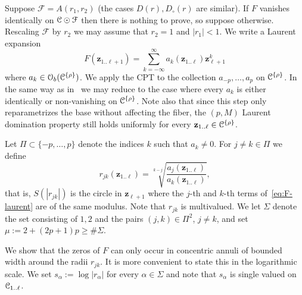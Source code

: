 \documentclass[reqno]{amsart}
\renewcommand\ge{\geqslant} \renewcommand\le{\leqslant}
\renewcommand\~[1]{\widetilde{#1}}
\def\cF{{\mathcal F}} \def\cL{{\mathcal L}} \def\cR{{\mathcal R}}
\def\cO{{\mathcal O}}
\def\vz{{\mathbf z}}
\def\he#1{{\{#1\}}}
\def\hrho{{\he\rho}}
\begin{document}
Suppose $\cF=A(r_1,r_2)$ (the cases $D(r),D_\circ(r)$ are similar).
If $F$ vanishes identically on $\cC\odot\cF$ then there is nothing to
prove, so suppose otherwise. Rescaling $\cF$ by $r_2$ we may assume
that $r_2=1$ and $|r_1|<1$. We write a Laurent expansion
\begin{equation}\label{eq:F-laurent}
  F(\vz_{1..\ell+1}) = \sum_{k=-\infty}^\infty a_k(\vz_{1..\ell}) \vz_{\ell+1}^k
\end{equation}
where $a_k\in\cO_b(\cC^\hrho)$. We apply the CPT to the collection
$a_{-p},\ldots,a_p$ on $\cC^\hrho$. In the same way as
in~ we may reduce to the case where
every $a_k$ is either identically or non-vanishing on
$\cC^\hrho$. Note also that since this step only reparametrizes the
base without affecting the fiber, the $(p,M)$ Laurent domination
property still holds uniformly for every $\vz_{1..\ell}\in\cC^\hrho$.

Let $\Pi\subset\{-p,\ldots,p\}$ denote the indices $k$ such that
$a_k\neq0$. For $j\neq k\in\Pi$ we define
\begin{equation}
  r_{jk}(\vz_{1..\ell}) = \sqrt[k-j]{\frac{a_j(\vz_{1..\ell})}{a_k(\vz_{1..\ell})}},
\end{equation}
that is, $S(|r_{jk}|)$ is the circle in $\vz_{\ell+1}$ where the
$j$-th and $k$-th terms of~\eqref{eq:F-laurent} are of the same
modulus. Note that $r_{jk}$ is multivalued. We let $\Sigma$ denote the
set consisting of $1,2$ and the pairs $(j,k)\in\Pi^2$, $j\not=k$, and
set $\mu:=2+(2p+1)p\ge\#\Sigma$.  

We show that the zeros of $F$ can only occur in concentric annuli of
bounded width around the radii $r_{jk}$. It is more convenient to
state this in the logarithmic scale. We set $s_\alpha:=\log|r_\alpha|$
for every $\alpha\in\Sigma$ and note that $s_\alpha$ is single valued
on ${\mathcal C}_{1..\ell}$.
\end{document}
